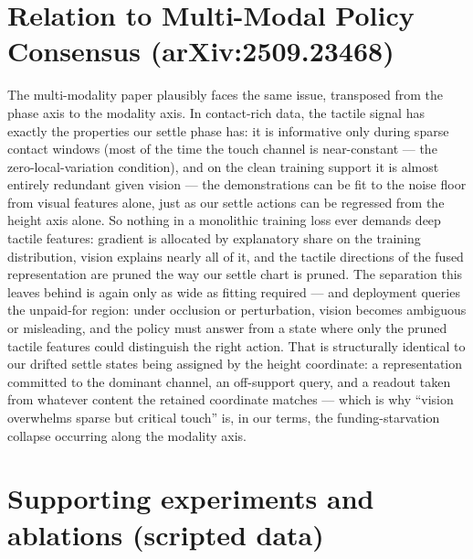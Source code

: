 \documentclass[11pt]{article}
\begin{document}
\section*{Relation to Multi-Modal Policy Consensus (arXiv:2509.23468)}

The multi-modality paper plausibly faces the same issue, transposed from the
phase axis to the modality axis. In contact-rich data, the tactile signal has
exactly the properties our settle phase has: it is informative only during
sparse contact windows (most of the time the touch channel is near-constant
--- the zero-local-variation condition), and on the clean training support it
is almost entirely redundant given vision --- the demonstrations can be fit
to the noise floor from visual features alone, just as our settle actions can
be regressed from the height axis alone. So nothing in a monolithic training
loss ever demands deep tactile features: gradient is allocated by explanatory
share on the training distribution, vision explains nearly all of it, and the
tactile directions of the fused representation are pruned the way our settle
chart is pruned. The separation this leaves behind is again only as wide as
fitting required --- and deployment queries the unpaid-for region: under
occlusion or perturbation, vision becomes ambiguous or misleading, and the
policy must answer from a state where only the pruned tactile features could
distinguish the right action. That is structurally identical to our drifted
settle states being assigned by the height coordinate: a representation
committed to the dominant channel, an off-support query, and a readout taken
from whatever content the retained coordinate matches --- which is why
``vision overwhelms sparse but critical touch'' is, in our terms, the
funding-starvation collapse occurring along the modality axis.


\section*{Supporting experiments and ablations (scripted data)}
\end{document}
